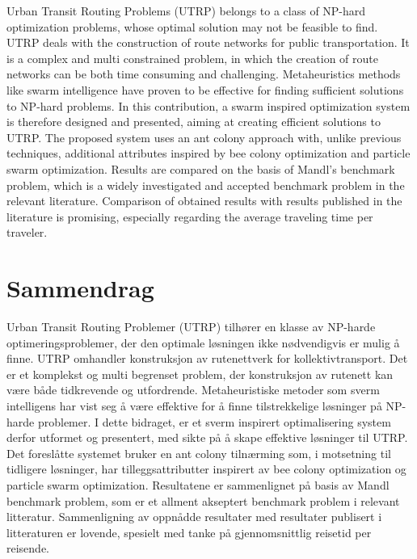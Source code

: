 

Urban Transit Routing Problems (UTRP) belongs to a class of NP-hard optimization problems, whose optimal solution may not be feasible to find. UTRP deals with the construction of route networks for public transportation. It is a complex and multi constrained problem, in which the creation of route networks can be both time consuming and challenging. Metaheuristics methods like swarm intelligence have proven to be effective for finding sufficient solutions to NP-hard problems. In this contribution, a swarm inspired optimization system is therefore designed and presented, aiming at creating efficient solutions to UTRP. The proposed system uses an ant colony approach with, unlike previous techniques, additional attributes inspired by bee colony optimization and particle swarm optimization. Results are compared on the basis of Mandl's benchmark problem, which is a widely investigated and accepted benchmark problem in the relevant literature. Comparison of obtained results with results published in the literature is promising, especially regarding the average traveling time per traveler.


\section*{Sammendrag}

Urban Transit Routing Problemer (UTRP) tilhører en klasse av NP-harde optimeringsproblemer, der den optimale løsningen ikke nødvendigvis er mulig å finne. UTRP omhandler konstruksjon av rutenettverk for kollektivtransport. Det er et komplekst og multi begrenset problem, der konstruksjon av rutenett kan være både tidkrevende og utfordrende. Metaheuristiske metoder som sverm intelligens har vist seg å være effektive for å finne tilstrekkelige løsninger på NP-harde problemer. I dette bidraget, er et sverm inspirert optimalisering system derfor utformet og presentert, med sikte på å skape effektive løsninger til UTRP. Det foreslåtte systemet bruker en ant colony tilnærming som, i motsetning til tidligere løsninger, har tilleggsattributter inspirert av bee colony optimization og particle swarm optimization. Resultatene er sammenlignet på basis av Mandl benchmark problem, som er et allment akseptert benchmark problem i  relevant litteratur. Sammenligning av oppnådde resultater med resultater publisert i litteraturen er lovende, spesielt med tanke på gjennomsnittlig reisetid per reisende.
